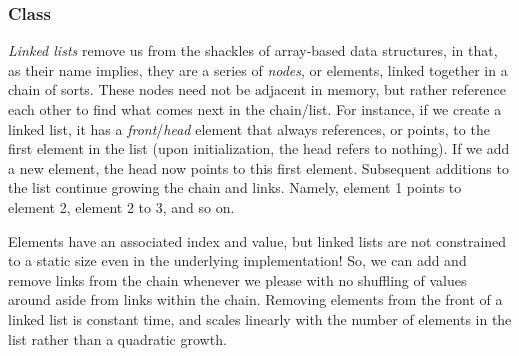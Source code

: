 \subsubsection*{ Class}
\textit{Linked lists} remove us from the shackles of array-based data structures, in that, as their name implies, they are a series of \textit{nodes}, or elements, linked together in a chain of sorts. These nodes need not be adjacent in memory, but rather reference each other to find what comes next in the chain/list. For instance, if we create a linked list, it has a \textit{front}/\textit{head} element that always references, or points, to the first element in the list (upon initialization, the head refers to nothing). If we add a new element, the head now points to this first element. Subsequent additions to the list continue growing the chain and links. Namely, element 1 points to element 2, element 2 to 3, and so on. 

Elements have an associated index and value, but linked lists are not constrained to a static size even in the underlying implementation! So, we can add and remove links from the chain whenever we please with no shuffling of values around aside from links within the chain. Removing elements from the front of a linked list is constant time, and scales linearly with the number of elements in the list rather than a quadratic growth.

